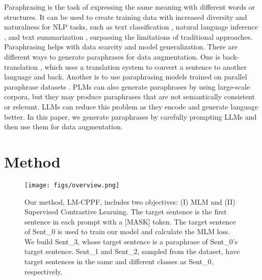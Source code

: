 \documentclass[11pt]{article}
\begin{document}
Paraphrasing is the task of expressing the same meaning with different words or structures. It can be used to create training data with increased diversity and naturalness for NLP tasks, such as text classification \cite{xie2020unsupervised}, natural language inference \cite{kumar-etal-2019-submodular}, and text summarization \cite{loem-etal-2022-extraphrase}, surpassing the limitations of traditional approaches. Paraphrasing helps with data scarcity and model generalization. There are different ways to generate paraphrases for data augmentation. One is back-translation \cite{sennrich-etal-2016-improving}, which uses a translation system to convert a sentence to another language and back. Another is to use paraphrasing models trained on parallel paraphrase datasets \cite{wieting-gimpel-2018-paranmt, zhu-etal-2022-duqm}. PLMs can also generate paraphrases by using large-scale corpora, but they may produce paraphrases that are not semantically consistent or relevant. LLMs can reduce this problem as they encode and generate language better. In this paper, we generate paraphrases by carefully prompting LLMs and then use them for data augmentation.

\section{Method}
\label{sec:method}

\begin{figure*}
  \centering
  \texttt{[image: figs/overview.png]}
  \caption{\label{fig:fine-tuning} Our method, LM-CPPF, includes two objectives: (I) MLM and (II) Supervised Contrastive Learning. The target sentence is the first sentence in each prompt with a [MASK] token. The target sentence of Sent\_0 is used to train our model and calculate the MLM loss. We build Sent\_3, whose target sentence is a paraphrase of Sent\_0's target sentence. Sent\_1 and Sent\_2, sampled from the dataset, have target sentences in the same and different classes as Sent\_0, respectively.}
\end{figure*}
\end{document}
